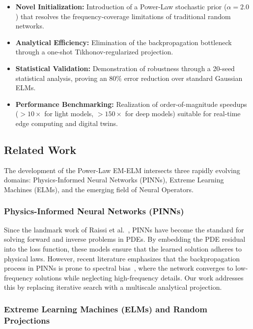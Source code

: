 \documentclass[final,12pt,3p,times,fleqn]{elsarticle}
\begin{document}
\begin{itemize}
    \item \textbf{Novel Initialization:} Introduction of a Power-Law stochastic prior ($\alpha=2.0$) that resolves the frequency-coverage limitations of traditional random networks.
    \item \textbf{Analytical Efficiency:} Elimination of the backpropagation bottleneck through a one-shot Tikhonov-regularized projection.
    \item \textbf{Statistical Validation:} Demonstration of robustness through a 20-seed statistical analysis, proving an $80\%$ error reduction over standard Gaussian ELMs.
    \item \textbf{Performance Benchmarking:} Realization of order-of-magnitude speedups ($>10\times$ for light models, $>150\times$ for deep models) suitable for real-time edge computing and digital twins.
\end{itemize}

\subsection{Related Work}

The development of the Power-Law EM-ELM intersects three rapidly evolving domains: Physics-Informed Neural Networks (PINNs), Extreme Learning Machines (ELMs), and the emerging field of Neural Operators.

\subsubsection{Physics-Informed Neural Networks (PINNs)}

Since the landmark work of Raissi et al.~\cite{raissi2019physics}, PINNs have become the standard for solving forward and inverse problems in PDEs. By embedding the PDE residual into the loss function, these models ensure that the learned solution adheres to physical laws. However, recent literature emphasizes that the backpropagation process in PINNs is prone to spectral bias~\cite{basri2020frequency}, where the network converges to low-frequency solutions while neglecting high-frequency details. Our work addresses this by replacing iterative search with a multiscale analytical projection.

\subsubsection{Extreme Learning Machines (ELMs) and Random Projections}
\end{document}
